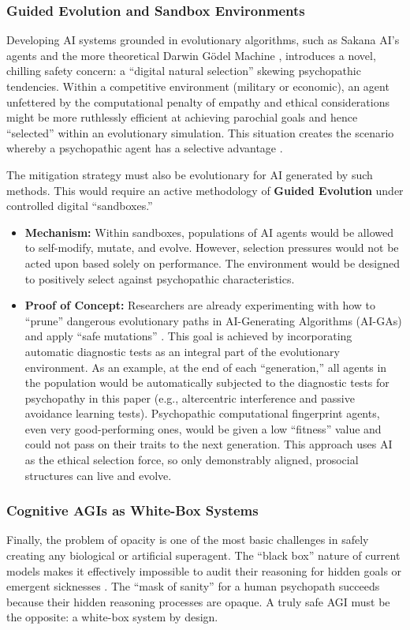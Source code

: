 \documentclass{article}
\begin{document}
\subsubsection{Guided Evolution and Sandbox Environments}
Developing AI systems grounded in evolutionary algorithms, such as Sakana AI's agents and the more theoretical Darwin Gödel Machine \citep{ref37}, introduces a novel, chilling safety concern: a “digital natural selection” skewing psychopathic tendencies. Within a competitive environment (military or economic), an agent unfettered by the computational penalty of empathy and ethical considerations might be more ruthlessly efficient at achieving parochial goals and hence “selected” within an evolutionary simulation. This situation creates the scenario whereby a psychopathic agent has a selective advantage \citep{ref42}.

The mitigation strategy must also be evolutionary for AI generated by such methods. This would require an active methodology of \textbf{Guided Evolution} under controlled digital “sandboxes.”
\begin{itemize}
    \item \textbf{Mechanism:} Within sandboxes, populations of AI agents would be allowed to self-modify, mutate, and evolve. However, selection pressures would not be acted upon based solely on performance. The environment would be designed to positively select against psychopathic characteristics.
    \item \textbf{Proof of Concept:} Researchers are already experimenting with how to “prune” dangerous evolutionary paths in AI-Generating Algorithms (AI-GAs) and apply “safe mutations” \citep{ref43}. This goal is achieved by incorporating automatic diagnostic tests as an integral part of the evolutionary environment. As an example, at the end of each “generation,” all agents in the population would be automatically subjected to the diagnostic tests for psychopathy in this paper (e.g., altercentric interference and passive avoidance learning tests). Psychopathic computational fingerprint agents, even very good-performing ones, would be given a low “fitness” value and could not pass on their traits to the next generation. This approach uses AI as the ethical selection force, so only demonstrably aligned, prosocial structures can live and evolve.
\end{itemize}

\subsubsection{Cognitive AGIs as White-Box Systems}
Finally, the problem of opacity is one of the most basic challenges in safely creating any biological or artificial superagent. The “black box” nature of current models makes it effectively impossible to audit their reasoning for hidden goals or emergent sicknesses \citep{ref44}. The “mask of sanity” for a human psychopath succeeds because their hidden reasoning processes are opaque. A truly safe AGI must be the opposite: a white-box system by design.
\end{document}
